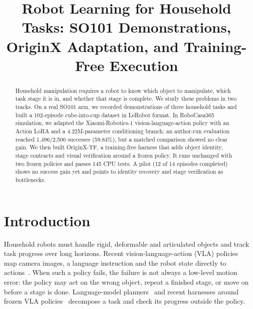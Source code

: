 \documentclass[conference]{IEEEtran}
\begin{document}
\raggedbottom

\title{Robot Learning for Household Tasks: SO101 Demonstrations, OriginX Adaptation, and Training-Free Execution}

\author{
}

\maketitle

\begin{abstract}
Household manipulation requires a robot to know which object to manipulate, which task stage it is in, and whether that stage is complete. We study these problems in two tracks. On a real SO101 arm, we recorded demonstrations of three household tasks and built a 102-episode cube-into-cup dataset in LeRobot format. In RoboCasa365 simulation, we adapted the Xiaomi-Robotics-1 vision-language-action policy with an Action LoRA and a 4.22M-parameter conditioning branch; an author-run evaluation reached 1,496/2,500 successes (59.84\%), but a matched comparison showed no clear gain. We then built OriginX-TF, a training-free harness that adds object identity, stage contracts and visual verification around a frozen policy. It runs unchanged with two frozen policies and passes 145 CPU tests. A pilot (12 of 14 episodes completed) shows no success gain yet and points to identity recovery and stage verification as bottlenecks.
\end{abstract}

\section{Introduction}
Household robots must handle rigid, deformable and articulated objects and track task progress over long horizons. Recent vision-language-action (VLA) policies map camera images, a language instruction and the robot state directly to actions~\cite{xiaomi2026robotics1}. When such a policy fails, the failure is not always a low-level motion error: the policy may act on the wrong object, repeat a finished stage, or move on before a stage is done. Language-model planners~\cite{ahn2022saycan,huang2022inner} and recent harnesses around frozen VLA policies~\cite{li2026roboharness,gao2026agm} decompose a task and check its progress outside the policy.
\end{document}
